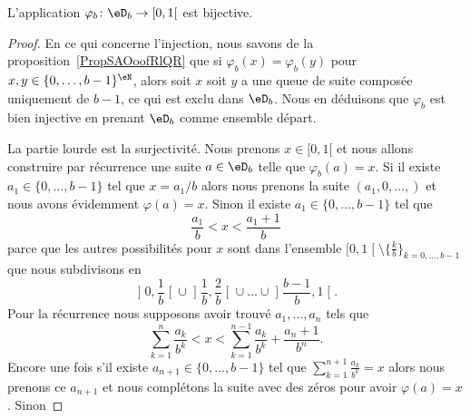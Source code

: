 \begin{theorem} \label{ThoRXBootpUpd}
    L'application \( \varphi_b\colon \eD_b\to \mathopen[ 0 , 1 [\) est bijective.
\end{theorem}

\begin{proof}
    En ce qui concerne l'injection, nous savons de la proposition~\ref{PropSAOoofRlQR} que si \( \varphi_b(x)=\varphi_b(y)\) pour \( x,y\in\{ 0,\ldots, b-1 \}^{\eN}\), alors soit \( x\) soit \( y\) a une queue de suite composée uniquement de \( b-1\), ce qui est exclu dans \( \eD_b\). Nous en déduisons que \( \varphi_b\) est bien injective en prenant \( \eD_b\) comme ensemble départ.

    La partie lourde est la surjectivité. Nous prenons \( x\in \mathopen[ 0 , 1 [\) et nous allons construire par récurrence une suite \( a\in \eD_b\) telle que \( \varphi_b(a)=x\). Si il existe \( a_1\in\{ 0,\ldots, b-1 \}\) tel que \( x=a_1/b\) alors nous prenons la suite \( (a_1,0,\ldots, )\) et nous avons évidemment \( \varphi(a)=x\). Sinon il existe \( a_1\in\{ 0,\ldots, b-1 \}\) tel que
        \begin{equation}
            \frac{ a_1 }{ b }<x<\frac{ a_1+1 }{ b }
        \end{equation}
        parce que les autres possibilités pour \( x\) sont dans l'ensemble \( \mathopen[ 0 , 1 \mathclose[\setminus\{ \frac{ k }{ b } \}_{k=0,\ldots, b-1}\) que nous subdivisons en
        \begin{equation}
        \mathopen] 0 , \frac{1}{ b } \mathclose[\cup\mathopen] \frac{1}{ b } , \frac{ 2 }{ b } \mathclose[\cup\ldots\cup\mathopen] \frac{ b-1 }{ b } , 1 \mathclose[.
        \end{equation}
        Pour la récurrence nous supposons avoir trouvé \( a_1,\ldots, a_n\) tels que
        \begin{equation}
            \sum_{k=1}^n\frac{ a_k }{ b^k }< x<\sum_{k=1}^{n-1}\frac{ a_k }{ b^k }+\frac{ a_n+1 }{ b^n }.
        \end{equation}
    Encore une fois s'il existe \( a_{n+1}\in\{ 0,\ldots, b-1 \}\) tel que \( \sum_{k=1}^{n+1}\frac{ a_k }{ b^k }=x\) alors nous prenons ce \( a_{n+1}\) et nous complétons la suite avec des zéros pour avoir \( \varphi(a)=x\). Sinon

\end{proof}
